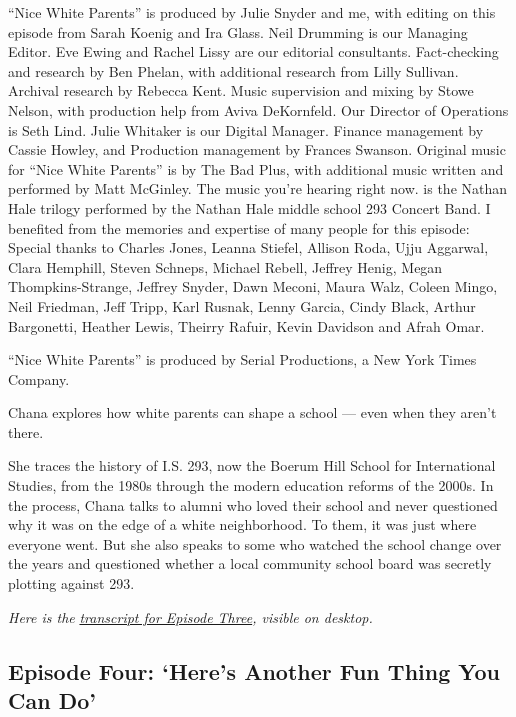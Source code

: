 ``Nice White Parents'' is produced by Julie Snyder and me, with editing
on this episode from Sarah Koenig and Ira Glass. Neil Drumming is our
Managing Editor. Eve Ewing and Rachel Lissy are our editorial
consultants. Fact-checking and research by Ben Phelan, with additional
research from Lilly Sullivan. Archival research by Rebecca Kent. Music
supervision and mixing by Stowe Nelson, with production help from Aviva
DeKornfeld. Our Director of Operations is Seth Lind. Julie Whitaker is
our Digital Manager. Finance management by Cassie Howley, and Production
management by Frances Swanson. Original music for ``Nice White Parents''
is by The Bad Plus, with additional music written and performed by Matt
McGinley. The music you're hearing right now. is the Nathan Hale trilogy
performed by the Nathan Hale middle school 293 Concert Band. I benefited
from the memories and expertise of many people for this episode: Special
thanks to Charles Jones, Leanna Stiefel, Allison Roda, Ujju Aggarwal,
Clara Hemphill, Steven Schneps, Michael Rebell, Jeffrey Henig, Megan
Thompkins-Strange, Jeffrey Snyder, Dawn Meconi, Maura Walz, Coleen
Mingo, Neil Friedman, Jeff Tripp, Karl Rusnak, Lenny Garcia, Cindy
Black, Arthur Bargonetti, Heather Lewis, Theirry Rafuir, Kevin Davidson
and Afrah Omar.

``Nice White Parents'' is produced by Serial Productions, a New York
Times Company.

Chana explores how white parents can shape a school --- even when they
aren't there.

She traces the history of I.S. 293, now the Boerum Hill School for
International Studies, from the 1980s through the modern education
reforms of the 2000s. In the process, Chana talks to alumni who loved
their school and never questioned why it was on the edge of a white
neighborhood. To them, it was just where everyone went. But she also
speaks to some who watched the school change over the years and
questioned whether a local community school board was secretly plotting
against 293.

\emph{Here is the}
\href{https://www.nytimes3xbfgragh.onion/2020/08/06/podcasts/episode-three-this-is-our-school-how-dare-you.html?showTranscript=1}{\emph{transcript
for Episode Three}}\emph{, visible on desktop.}

\hypertarget{episode-four-heres-another-fun-thing-you-can-do}{%
\subsection{Episode Four: `Here's Another Fun Thing You Can
Do'}\label{episode-four-heres-another-fun-thing-you-can-do}}


